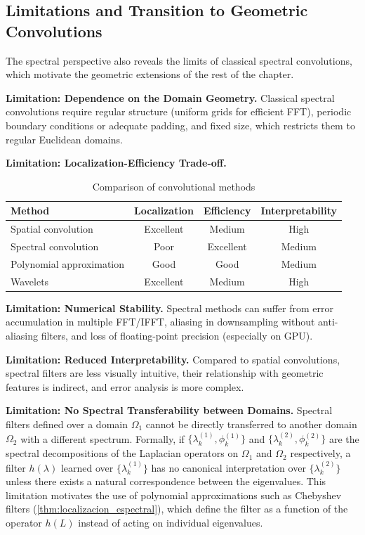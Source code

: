 \subsection{Limitations and Transition to Geometric Convolutions}\label{subsec:aplicaciones_limitaciones}

The spectral perspective also reveals the limits of classical spectral convolutions, which motivate the geometric extensions of the rest of the chapter.

\textbf{Limitation: Dependence on the Domain Geometry.}\label{lim:geometria_dominio} Classical spectral convolutions require regular structure (uniform grids for efficient \gls{FFT}), periodic boundary conditions or adequate padding, and fixed size, which restricts them to regular Euclidean domains.

\textbf{Limitation: Localization-Efficiency Trade-off.}\label{lim:tradeoff_localizacion}
\begin{table}[h]
\centering
\begin{tabular}{|l|c|c|c|}
\hline
\textbf{Method} & \textbf{Localization} & \textbf{Efficiency} & \textbf{Interpretability} \\
\hline
Spatial convolution & Excellent & Medium & High \\
Spectral convolution & Poor & Excellent & Medium \\
Polynomial approximation & Good & Good & Medium \\
Wavelets & Excellent & Medium & High \\
\hline
\end{tabular}
\caption{Comparison of convolutional methods}
\label{tab:comparacion_metodos}
\end{table}

\textbf{Limitation: Numerical Stability.}\label{lim:estabilidad_numerica} Spectral methods can suffer from error accumulation in multiple \gls{FFT}/IFFT, aliasing in downsampling without anti-aliasing filters, and loss of floating-point precision (especially on GPU).

\textbf{Limitation: Reduced Interpretability.}\label{lim:interpretabilidad} Compared to spatial convolutions, spectral filters are less visually intuitive, their relationship with geometric features is indirect, and error analysis is more complex.

\textbf{Limitation: No Spectral Transferability between Domains.}\label{lim:transferibilidad} Spectral filters defined over a domain $\Omega_1$ cannot be directly transferred to another domain $\Omega_2$ with a different spectrum. Formally, if $\{\lambda_k^{(1)}, \phi_k^{(1)}\}$ and $\{\lambda_k^{(2)}, \phi_k^{(2)}\}$ are the spectral decompositions of the Laplacian operators on $\Omega_1$ and $\Omega_2$ respectively, a filter $h(\lambda)$ learned over $\{\lambda_k^{(1)}\}$ has no canonical interpretation over $\{\lambda_k^{(2)}\}$ unless there exists a natural correspondence between the eigenvalues. This limitation motivates the use of polynomial approximations such as Chebyshev filters (\autoref{thm:localizacion_espectral}), which define the filter as a function of the operator $h(L)$ instead of acting on individual eigenvalues.

